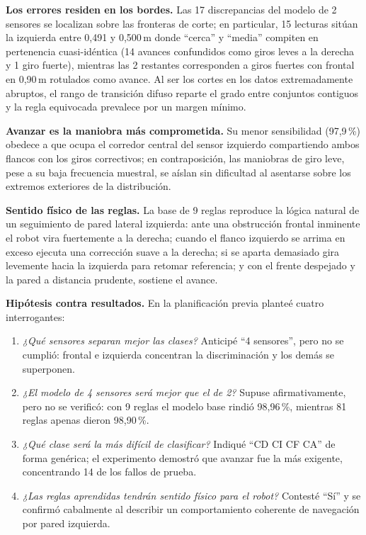 \documentclass[11pt,letterpaper]{article}
\begin{document}
\textbf{Los errores residen en los bordes.} Las 17 discrepancias del modelo de 2 sensores se localizan sobre las fronteras de corte; en particular, 15 lecturas sitúan la izquierda entre 0,491 y 0,500\,m donde ``cerca'' y ``media'' compiten en pertenencia cuasi-idéntica (14 avances confundidos como giros leves a la derecha y 1 giro fuerte), mientras las 2 restantes corresponden a giros fuertes con frontal en 0,90\,m rotulados como avance. Al ser los cortes en los datos extremadamente abruptos, el rango de transición difuso reparte el grado entre conjuntos contiguos y la regla equivocada prevalece por un margen mínimo.

\textbf{Avanzar es la maniobra más comprometida.} Su menor sensibilidad (97,9\,\%) obedece a que ocupa el corredor central del sensor izquierdo compartiendo ambos flancos con los giros correctivos; en contraposición, las maniobras de giro leve, pese a su baja frecuencia muestral, se aíslan sin dificultad al asentarse sobre los extremos exteriores de la distribución.

\textbf{Sentido físico de las reglas.} La base de 9 reglas reproduce la lógica natural de un seguimiento de pared lateral izquierda: ante una obstrucción frontal inminente el robot vira fuertemente a la derecha; cuando el flanco izquierdo se arrima en exceso ejecuta una corrección suave a la derecha; si se aparta demasiado gira levemente hacia la izquierda para retomar referencia; y con el frente despejado y la pared a distancia prudente, sostiene el avance.

\textbf{Hipótesis contra resultados.} En la planificación previa planteé cuatro interrogantes:
\begin{enumerate}
\item \textit{¿Qué sensores separan mejor las clases?} Anticipé ``4 sensores'', pero no se cumplió: frontal e izquierda concentran la discriminación y los demás se superponen.
\item \textit{¿El modelo de 4 sensores será mejor que el de 2?} Supuse afirmativamente, pero no se verificó: con 9 reglas el modelo base rindió 98,96\,\%, mientras 81 reglas apenas dieron 98,90\,\%.
\item \textit{¿Qué clase será la más difícil de clasificar?} Indiqué ``CD CI CF CA'' de forma genérica; el experimento demostró que avanzar fue la más exigente, concentrando 14 de los fallos de prueba.
\item \textit{¿Las reglas aprendidas tendrán sentido físico para el robot?} Contesté ``Sí'' y se confirmó cabalmente al describir un comportamiento coherente de navegación por pared izquierda.
\end{enumerate}
\end{document}
